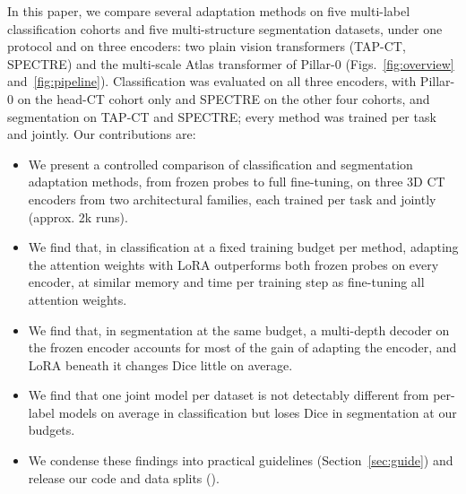 In this paper, we compare several adaptation methods on five multi-label classification cohorts and five multi-structure segmentation datasets, under one protocol and on three encoders: two plain vision transformers (TAP-CT, SPECTRE) and the multi-scale Atlas transformer of Pillar-0 (Figs.~\ref{fig:overview} and~\ref{fig:pipeline}). Classification was evaluated on all three encoders, with Pillar-0 on the head-CT cohort only and SPECTRE on the other four cohorts, and segmentation on TAP-CT and SPECTRE; every method was trained per task and jointly. Our contributions are:
\begin{itemize}\setlength{\itemsep}{1pt}
  \item We present a controlled comparison of \numClsMethodsN{} classification and \numSegMethodsN{} segmentation adaptation methods, from frozen probes to full fine-tuning, on three 3D CT encoders from two architectural families, each trained per task and jointly (approx. 2k runs).
  \item We find that, in classification at a fixed training budget per method, adapting the attention weights with LoRA outperforms both frozen probes on every encoder, at similar memory and time per training step as fine-tuning all attention weights.
  \item We find that, in segmentation at the same budget, a multi-depth decoder on the frozen encoder accounts for most of the gain of adapting the encoder, and LoRA beneath it changes Dice little on average.
  \item We find that one joint model per dataset is not detectably different from per-label models on average in classification but loses Dice in segmentation at our budgets.
  \item We condense these findings into practical guidelines (Section~\ref{sec:guide}) and release our code and data splits (\repourl{}).
\end{itemize}
